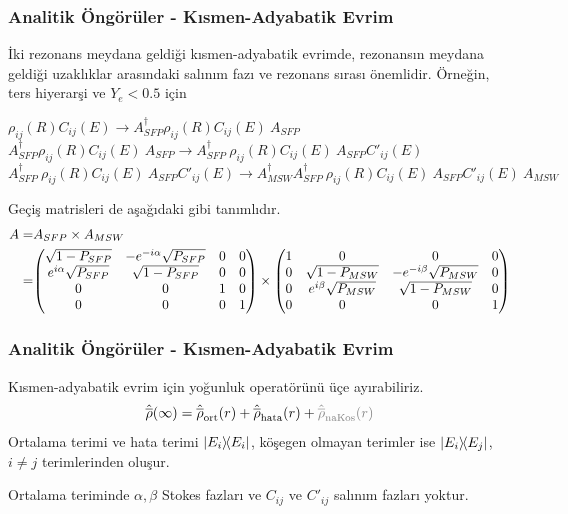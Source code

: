\documentclass[10pt]{beamer}
\begin{document}
\begin{frame}[noframenumbering]
    \frametitle{Analitik Öngörüler - Kısmen-Adyabatik Evrim}
    İki rezonans meydana geldiği kısmen-adyabatik evrimde, rezonansın meydana geldiği uzaklıklar arasındaki salınım fazı ve rezonans sırası önemlidir. Örneğin, ters hiyerarşi ve $ Y_{e}<0.5 $ için
    \begin{outline}
        \1[\textbf{1)}] $\rho_{ij}(R)C_{ij}(E) \rightarrow A^{\dagger}_{SFP}\rho_{ij}(R)C_{ij}(E)~A_{SFP}$
        \1[\textbf{2)}] $A^{\dagger}_{SFP}\rho_{ij}(R)C_{ij}(E)~A_{SFP} \rightarrow A^{\dagger}_{SFP} ~ \rho_{ij}(R)C_{ij}(E)~A_{SFP} C'_{ij}(E)$
        \1[\textbf{3)}] $A^{\dagger}_{SFP} ~ \rho_{ij}(R)C_{ij}(E)~A_{SFP} C'_{ij}(E)\rightarrow A^{\dagger}_{MSW}A^{\dagger}_{SFP}~\rho_{ij}(R)C_{ij}(E)~A_{SFP} C'_{ij}(E)~A_{MSW}$
    \end{outline}
    Geçiş matrisleri de aşağıdaki gibi tanımlıdır.
    \tiny
    \begin{align*}
        A =& A_{SFP} \times A_{MSW}\\
          =& \mqty(\sqrt{1-P_{SFP}} & -e^{-i\alpha}\sqrt{P_{SFP}} & 0 & 0 \\
      e^{i\alpha}\sqrt{P_{SFP}} & \sqrt{1-P_{SFP}} & 0 & 0 \\ 0 & 0 & 1 & 0 \\ 0 & 0 & 0 & 1) \times
      \mqty(1 & 0 & 0 & 0 \\ 0 & \sqrt{1-P_{MSW}} & -e^{-i\beta}\sqrt{P_{MSW}} & 0 \\ 0 & e^{i\beta}\sqrt{P_{MSW}} & \sqrt{1-P_{MSW}} & 0 \\ 0 & 0 & 0 & 1)
    \end{align*}
    \normalsize
\end{frame}

\begin{frame}
    \frametitle{Analitik Öngörüler - Kısmen-Adyabatik Evrim}
    Kısmen-adyabatik evrim için yoğunluk operatörünü üçe ayırabiliriz.
    \begin{equation*}
        \hat{\overline{\rho}}(\infty) = \hat{\overline{\rho}}_{\text{ort}}(r) + \hat{\overline{\rho}}_{\text{hata}}(r) + {\color{gray}\hat{\overline{\rho}}_{\text{naKos}}(r)}
    \end{equation*}
    Ortalama terimi ve hata terimi $ \dyad{E_{i}}{E_{i}} $, köşegen olmayan terimler ise $ \dyad{E_{i}}{E_{j}} $, $ i \ne j $ terimlerinden oluşur.

    Ortalama teriminde $ \alpha,\beta $ Stokes fazları ve $C_{ij}$ ve $C'_{ij}$ salınım fazları yoktur.

\end{frame}
\end{document}
